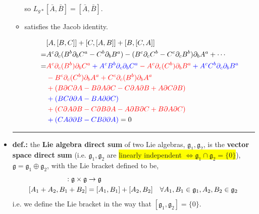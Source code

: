 \begin{itemize}
\begin{itemize}
\begin{tcolorbox}[title=proof:]
			so $L_{g *} [\bar{A}, \bar{B}] = [\bar{A}, \bar{B}]$.
		\end{tcolorbox}
		
		\item satisfies the Jacob identity.
		
		\begin{tcolorbox}[title=proof:]
			\begin{align}
				& [A, [B, C]] + [C, [A, B]] + [B, [C, A]] \notag \\
				= & A^c \partial_c (B^b \partial_b C^a - C^b \partial_b B^a) - (B^c \partial_c C^b - C^c \partial_c B^b) \partial_b A^a + \cdots \notag \\
				= & \mathcolor{red}{A^c \partial_c (B^b) \partial_b C^a} \mathcolor{blue}{+ A^c B^b \partial_c \partial_b C^a} \mathcolor{red}{- A^c \partial_c (C^b) \partial_b B^a} \mathcolor{blue}{+ A^c C^b \partial_c \partial_b B^a} \notag \\
				& \mathcolor{red}{- B^c \partial_c (C^b) \partial_b A^a + C^c \partial_c (B^b) \partial_b A^a} \notag \\
				& \mathcolor{red}{+ (B \partial C \partial A - B \partial A \partial C - C \partial A \partial B + A \partial C \partial B)} \notag \\
				& \mathcolor{blue}{+ (B C \partial \partial A - B A \partial \partial C)} \notag \\
				& \mathcolor{red}{+ (C \partial A \partial B - C \partial B \partial A - A \partial B \partial C + B \partial A \partial C)} \notag \\
				& \mathcolor{blue}{+ (C A \partial \partial B - C B \partial \partial A)} = 0
			\end{align}
		\end{tcolorbox}
	\end{itemize}
	
	\noindent\rule[0.5ex]{\linewidth}{0.5pt} %
	
	\item \textbf{def.:} the \textbf{Lie algebra direct sum} of two Lie algebras, $\mathfrak{g}_1, \mathfrak{g}_2$, is the \textbf{vector space direct sum} (i.e. $\mathfrak{g}_1, \mathfrak{g}_2$ are \colorbox{yellow}{linearly independent $\iff \mathfrak{g}_1 \cap \mathfrak{g}_2 = \{0\}$}), $\mathfrak{g} = \mathfrak{g}_1 \oplus \mathfrak{g}_2$, with the Lie bracket defined to be,
	\begin{align}
		[\cdot, \cdot] : \mathfrak{g} \times \mathfrak{g} & \rightarrow \mathfrak{g} \notag \\
		[A_1 + A_2, B_1 + B_2] &= [A_1, B_1] + [A_2, B_2] \quad \forall A_1, B_1 \in \mathfrak{g}_1, A_2, B_2 \in \mathfrak{g}_2
	\end{align}
	i.e. we define the Lie bracket in the way that $[\mathfrak{g}_1, \mathfrak{g}_2] = \{0\}$.
\end{itemize}

